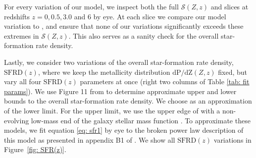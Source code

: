 \documentclass[linenumbers,twocolumn]{aastex631}
\newcommand{\SFRDzZ}{\ensuremath{\mathcal{S}(Z,z)}\xspace}
\newcommand{\SFRDz}{\ensuremath{\mathrm{SFRD}(z)}\xspace}
\newcommand{\dpdZ}{\ensuremath{\mathrm{dP/dZ}(Z,z)}\xspace}
\begin{document}
%

%

For every variation of our model, we inspect both the full \SFRDzZ and slices at redshifts $z = 0, 0.5, 3.0$ and $6$ by eye. At each slice we compare our model variation to , and ensure that none of our variations significantly exceeds these extremes in \SFRDzZ. This also serves as a sanity check for the overall star-formation rate density.


Lastly, we consider two variations of the overall star-formation rate density, \SFRDz, where we keep the metallicity distribution \dpdZ fixed, but vary all four \SFRDz parameters at once (right two columns of Table \ref{tab: fit params}). 
We use Figure 11 from \cite{Chruslinska+2021} to determine approximate upper and lower bounds to the overall star-formation rate density. We choose \cite{Madau+2017} as an approximation of the lower limit. 
For the upper limit, we use the upper edge of 
with a non-evolving low-mass end of the galaxy stellar mass function \citep[shown as a thick brown line in Fig. 11 of ][and described in their table B1]{Chruslinska+2021}.
To approximate these models, we fit equation \ref{eq: sfr1} by eye to the broken power law description of this model as presented in appendix B1 of \cite{Chruslinska+2021}.
We show all \SFRDz variations in Figure~\ref{fig: SFR(z)}. \\
\end{document}
